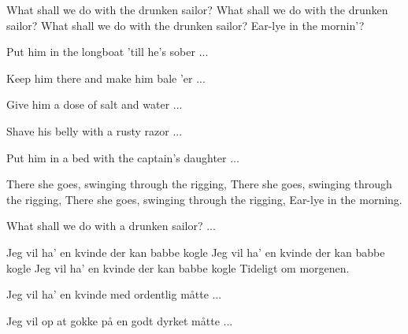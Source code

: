 {}
{}
{
What shall we do with the drunken sailor?
What shall we do with the drunken sailor?
What shall we do with the drunken sailor?
Ear-lye in the mornin'?


Put him in the longboat 'till he's sober ...     

Keep him there and make him bale 'er ...     

Give him a dose of salt and water ...     

Shave his belly with a rusty razor ...     

Put him in a bed with the captain's daughter ...     

There she goes, swinging through the rigging,
There she goes, swinging through the rigging,
There she goes, swinging through the rigging,
Ear-lye in the morning.


What shall we do with a drunken sailor? ...     

Jeg vil ha' en kvinde der kan babbe kogle
Jeg vil ha' en kvinde der kan babbe kogle
Jeg vil ha' en kvinde der kan babbe kogle
Tideligt om morgenen.


Jeg vil ha' en kvinde med ordentlig måtte ...     

Jeg vil op at gokke på en godt dyrket måtte ...     
}